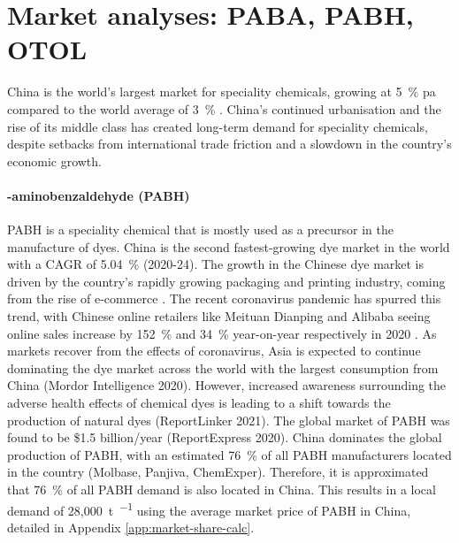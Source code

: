 \section{Market analyses: PABA, PABH, OTOL}
\label{sec:market-analysis}
China is the world’s largest market for speciality chemicals, growing at \SI{5}{\percent} pa compared to the world average of \SI{3}{\percent} \cite{blad_game_nodate}. China’s continued urbanisation and the rise of its middle class has created long-term demand for speciality chemicals, despite setbacks from international trade friction and a slowdown in the country’s economic growth.

\paragraph{\para-aminobenzaldehyde (PABH)}
PABH is a speciality chemical that is mostly used as a precursor in the manufacture of dyes. China is the second fastest-growing dye market in the world with a CAGR of \SI{5.04}{\percent} (2020-24). The growth in the Chinese dye market is driven by the country’s rapidly growing packaging and printing industry, coming from the rise of e-commerce \cite{reportlinker_synthetic_2021}. The recent coronavirus pandemic has spurred this trend, with Chinese online retailers like Meituan Dianping and Alibaba seeing online sales increase by \SI{152}{\percent} and \SI{34}{\percent} year-on-year respectively in 2020 \cite{}. As markets recover from the effects of coronavirus, Asia is expected to continue dominating the dye market across the world with the largest consumption from China (Mordor Intelligence 2020). However, increased awareness surrounding the adverse health effects of chemical dyes is leading to a shift towards the production of natural dyes (ReportLinker 2021). The global market of PABH was found to be \$1.5 billion/year (ReportExpress 2020). China dominates the global production of PABH, with an estimated \SI{76}{\percent} of all PABH manufacturers located in the country (Molbase, Panjiva, ChemExper). Therefore, it is approximated that \SI{76}{\percent} of all PABH demand is also located in China. This results in a local demand of 28,\SI{000}{\tonne\per\year} using the average market price of PABH in China, detailed in Appendix \ref{app:market-share-calc}.

